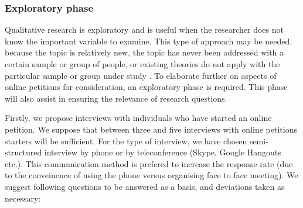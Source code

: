 \subsubsection{Exploratory phase}
Qualitative research is exploratory and is useful when the researcher does not know the important variable to examine. This type of approach may be needed, because the topic is relatively new, the topic has never been addressed with a certain sample or group of people, or existing theories do not apply with the particular sample or group under study \citep{Morse1991}. To elaborate further on aspects of online petitions for consideration, an exploratory phase is required. This phase will also assist in ensuring the relevance of research questions.\par\vspace{0.2cm}

Firstly, we propose interviews with individuals who have started an online petition. We suppose that between three and five interviews with online petitions starters will be sufficient. For the type of interview, we have chosen semi-structured interview by phone or by teleconference (Skype, Google Hangouts etc.). This communication method is prefered to increase the response rate (due to the conveinence of using the phone versus organising face to face meeting). We suggest following questions to be answered as a basis, and deviations taken as necessary:

